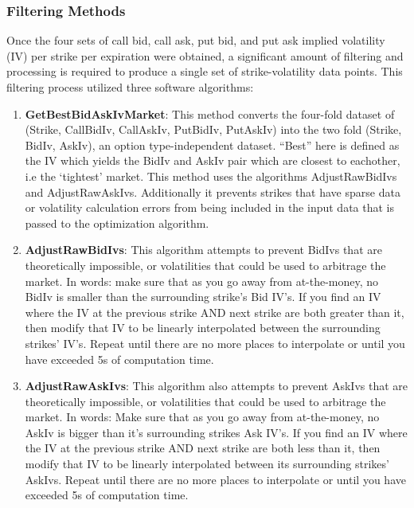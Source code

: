 \documentclass[12pt, a4paper, notitlepage]{article}
\numberwithin{equation}{subsection}
\numberwithin{figure}{subsection}
\numberwithin{table}{subsection}
\begin{document}
\subsubsection{Filtering Methods}\label{sec:FilteringMethods}
Once the four sets of call bid, call ask, put bid, and put ask implied volatility (IV) per strike per expiration were obtained, a significant amount of filtering and processing is required to produce a single set of strike-volatility data points.  This filtering process utilized three software algorithms:

\begin{enumerate}
	\item \textbf{GetBestBidAskIvMarket}:  This method converts the four-fold dataset of (Strike, CallBidIv, CallAskIv, PutBidIv, PutAskIv) into the two fold (Strike, BidIv, AskIv), an option type-independent dataset.  ``Best'' here is defined as the IV which yields the BidIv and AskIv pair which are closest to eachother, i.e the `tightest' market.  This method uses the algorithms AdjustRawBidIvs and AdjustRawAskIvs.  Additionally it prevents strikes that have sparse data or volatility calculation errors from being included in the input data that is passed to the optimization algorithm.
    \item \textbf{AdjustRawBidIvs}: This algorithm attempts to prevent BidIvs that are theoretically impossible, or volatilities that could be used to arbitrage the market.  In words: make sure that as you go away from at-the-money, no BidIv is smaller than the surrounding strike's Bid IV's.  If you find an IV where the IV at the previous strike AND next strike are both greater than it, then modify that IV to be linearly interpolated between the surrounding strikes' IV's.  Repeat until there are no more places to interpolate or until you have exceeded 5s of computation time.
    \item \textbf{AdjustRawAskIvs}:  This algorithm also attempts to prevent AskIvs that are theoretically impossible, or volatilities that could be used to arbitrage the market.  In words: Make sure that as you go away from at-the-money, no AskIv is bigger than it's surrounding strikes Ask IV's.  If you find an IV where the IV at the previous strike AND next strike are both less than it, then modify that IV to be linearly interpolated between its surrounding strikes' AskIvs.  Repeat until there are no more places to interpolate or until you have exceeded 5s of computation time.
\end{enumerate}
\end{document}
